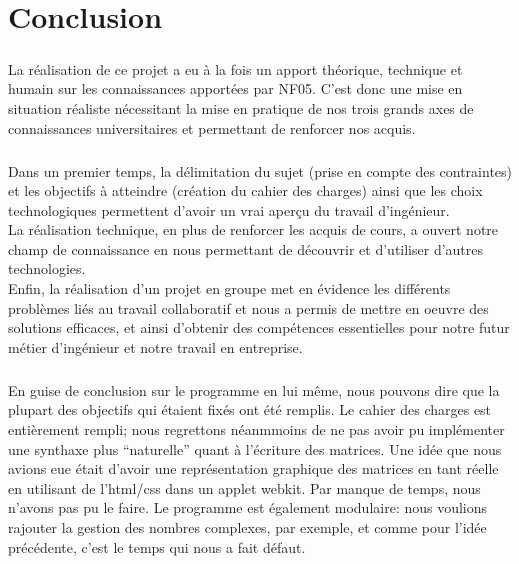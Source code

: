 \chapter{Conclusion}
    \paragraph{}
        La réalisation de ce projet a eu à la fois un apport théorique, technique et humain sur les connaissances apportées par NF05. C'est donc une mise en situation réaliste nécessitant la mise en pratique de nos trois grands axes de connaissances universitaires et permettant de renforcer nos acquis.

    \paragraph{}
        Dans un premier temps, la délimitation du sujet (prise en compte des contraintes) et les objectifs à atteindre (création du cahier des charges) ainsi que les choix technologiques permettent d'avoir un vrai aperçu du travail d'ingénieur.
        \\La réalisation technique, en plus de renforcer les acquis de cours, a ouvert notre champ de connaissance en nous permettant de découvrir et d'utiliser d'autres technologies.
        \\Enfin, la réalisation d'un projet en groupe met en évidence les différents problèmes liés au travail collaboratif et nous a permis de mettre en oeuvre des solutions efficaces, et ainsi d'obtenir des compétences essentielles pour notre futur métier d'ingénieur et notre travail en entreprise.

    \paragraph{}
        En guise de conclusion sur le programme en lui même, nous pouvons dire que la plupart des objectifs qui étaient fixés ont été remplis. Le cahier des charges est entièrement rempli; nous regrettons néanmmoins de ne pas avoir pu implémenter une synthaxe plus ``naturelle'' quant à l'écriture des matrices. Une idée que nous avions eue était d'avoir une représentation graphique des matrices en tant réelle en utilisant de l'html/css dans un applet webkit. Par manque de temps, nous n'avons pas pu le faire. Le programme est également modulaire: nous voulions rajouter la gestion des nombres complexes, par exemple, et comme pour l'idée précédente, c'est le temps qui nous a fait défaut.
